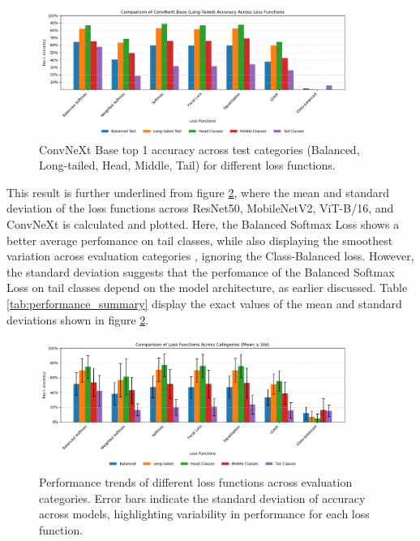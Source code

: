 \begin{figure}[H]
    \centering
    \includegraphics[width=0.9\textwidth]{Images/Plots/convnext_lt_loss_comparison.png}
    \caption{ConvNeXt Base top 1 accuracy across test categories (Balanced, Long-tailed, Head, Middle, Tail) for different loss functions.}
    \label{fig:conv_lt_loss_comparison}
\end{figure}

This result is further underlined from figure \ref{fig:loss_comparison_bars}, where the mean and standard deviation of the loss functions across ResNet50, MobileNetV2, ViT-B/16, and ConvNeXt is calculated and plotted. Here, the Balanced Softmax Loss shows a better average perfomance on tail classes, while also displaying the smoothest variation across evaluation categories , ignoring the Class-Balanced loss. However, the standard deviation suggests that the perfomance of the Balanced Softmax Loss on tail classes depend on the model architecture, as earlier discussed. Table \ref{tab:performance_summary} display the exact values of the mean and standard deviations shown in figure \ref{fig:loss_comparison_bars}. 

\begin{figure}[H]
    \centering
    \includegraphics[width=0.9\textwidth]{Images/Plots/loss_function_bar_plot_mean_std.png}
    \caption{Performance trends of different loss functions across evaluation categories. Error bars indicate the standard deviation of accuracy across models, highlighting variability in performance for each loss function.}
    \label{fig:loss_comparison_bars}
\end{figure}


